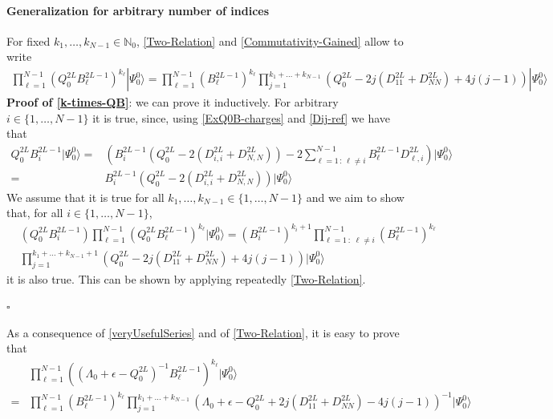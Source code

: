 \documentclass[10pt]{article}
\numberwithin{equation}{section}
\numberwithin{equation}{subsection}
\begin{document}
\paragraph{Generalization for arbitrary number of indices} For fixed $k_{1},\ldots,k_{N-1}\in \mathbb{N}_{0}$, \eqref{Two-Relation} and \eqref{Commutativity-Gained} allow to write 
\begin{equation}\label{k-times-QB}
	\begin{split}
		\prod_{\ell=1}^{N-1}\left(Q_{0}^{2L}B_{\ell}^{2L-1}\right)^{k_{\ell}}|\Psi_{0}^{0}\rangle=\prod_{\ell=1}^{N-1}\left(B_{\ell}^{2L-1}\right)^{k_{\ell}}\prod_{j=1}^{k_{1}+\ldots+k_{N-1}}\left(Q_{0}^{2L}-2j(D_{11}^{2L}+D_{NN}^{2L})+4j(j-1)\right)|\Psi_{0}^{0}\rangle
	\end{split}
\end{equation}
\textbf{Proof of \eqref{k-times-QB}}: we can prove it inductively. For arbitrary $i\in\{1,\ldots,N-1\}$ it is true, since, using \eqref{ExQ0B-charges} and \eqref{Dij-ref} we have that 
\begin{align}
	Q_{0}^{2L}B_{i}^{2L-1}|\Psi_{0}^{0}\rangle=&\left(B_{i}^{2L-1}\left(Q_{0}^{2L}-2(D_{i,i}^{2L}+D_{N,N}^{2L})\right)-2\sum_{\ell=1\,:\,\ell\neq i}^{N-1}B_{\ell}^{2L-1}D_{\ell,i}^{2L}\right)|\Psi_{0}^{0}\rangle\nonumber\\=&B_{i}^{2L-1}\left(Q_{0}^{2L}-2(D_{i,i}^{2L}+D_{N,N}^{2L})\right)|\Psi_{0}^{0}\rangle
\end{align}
We assume that it is true for all $k_{1},\ldots,k_{N-1}\in\{1,\ldots,N-1\}$ and we aim to show that, for all $i\in\{1,\ldots,N-1\}$,  
\begin{align}
&\left(Q_{0}^{2L}B_{i}^{2L-1}\right)\prod_{\ell=1}^{N-1}\left(Q_{0}^{2L}B_{\ell}^{2L-1}\right)^{k_{\ell}}|\Psi_{0}^{0}\rangle=\left(B_{i}^{2L-1}\right)^{k_{i}+1}\prod_{\ell=1\,:\;\ell\neq i}^{N-1}\left(B_{\ell}^{2L-1}\right)^{k_{\ell}}\nonumber\\&\prod_{j=1}^{k_{1}+\ldots+k_{N-1}+1}\left(Q_{0}^{2L}-2j(D_{11}^{2L}+D_{NN}^{2L})+4j(j-1)\right)|\Psi_{0}^{0}\rangle
\end{align}
it is also true. This can be shown by applying repeatedly \eqref{Two-Relation}.
\begin{flushright}
	$\square$
\end{flushright}
As a consequence of \eqref{veryUsefulSeries} and of \eqref{Two-Relation}, it is easy to prove that 
\begin{equation}\label{k-times-LQB}
	\begin{split}
		&\prod_{\ell=1}^{N-1}\left((\Lambda_{0}+\epsilon-Q_{0}^{2L})^{-1}B_{\ell}^{2L-1}\right)^{k_{\ell}}|\Psi_{0}^{0}\rangle\\=&\prod_{\ell=1}^{N-1}\left(B_{\ell}^{2L-1}\right)^{k_{\ell}}\prod_{j=1}^{k_{1}+\ldots+k_{N-1}}\left(\Lambda_{0}+\epsilon-Q_{0}^{2L}+2j(D_{11}^{2L}+D_{NN}^{2L})-4j(j-1)\right)^{-1}|\Psi_{0}^{0}\rangle
	\end{split}
\end{equation}
\end{document}
